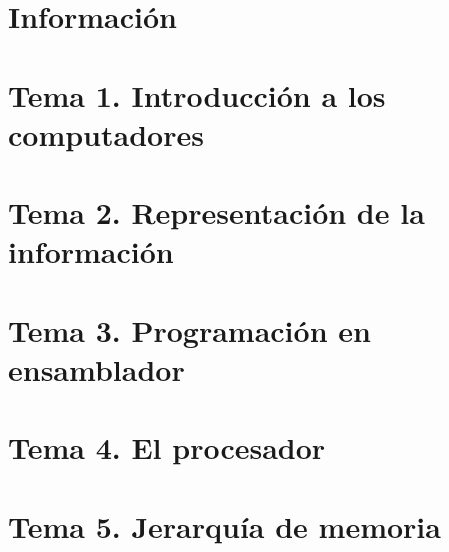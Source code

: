 \documentclass[12pt, twoside, openright]{report} %
\begin{document}
\clearpage
{} %




\part{Información}



\part{Tema 1. Introducción a los computadores}



\part{Tema 2. Representación de la información}




\part{Tema 3. Programación en ensamblador}







\part{Tema 4. El procesador}




\part{Tema 5. Jerarquía de memoria}



\end{document}
